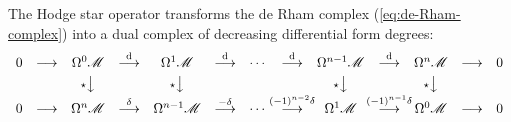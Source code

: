 The Hodge star operator transforms the de Rham complex  (\ref{eq:de-Rham-complex}) into a dual complex of decreasing differential form degrees:
\begin{equation}
	\begin{array}{*{13}{c}}
		0 & \longrightarrow &
		\Omega^{0} \mathscr{M} & \stackrel{\D\,}{\longrightarrow} & 
		\Omega^{1} \mathscr{M} & \stackrel{\D\,}{\longrightarrow} &
		\cdots & \stackrel{\D\,}{\longrightarrow} &
		\Omega^{n-1} \mathscr{M} & \stackrel{\D\,}{\longrightarrow} &
		\Omega^{n} \mathscr{M} & \longrightarrow &
		0
		\\ [.75ex]
		& & {\scriptstyle \star} \big\downarrow 
		& & {\scriptstyle \star} \big\downarrow
		& &
		& & {\scriptstyle \star} \big\downarrow
		& & {\scriptstyle \star} \big\downarrow
		\\ [.25ex]
		0 & \longrightarrow &
		\Omega^{n} \mathscr{M} & \stackrel{\delta}{\longrightarrow} &
		\Omega^{n-1} \mathscr{M} & \stackrel{-\delta}{\longrightarrow} &
		\cdots & \hspace*{-2ex} \stackrel{(-1)^{n-2}\delta}{\longrightarrow} \hspace*{-2ex} &
		\Omega^{1} \mathscr{M} & \hspace*{-2ex} \stackrel{(-1)^{n-1} \delta}{\longrightarrow} \hspace*{-2ex} &
		\Omega^{0} \mathscr{M} & \longrightarrow &
		0
	\end{array}
\end{equation}


